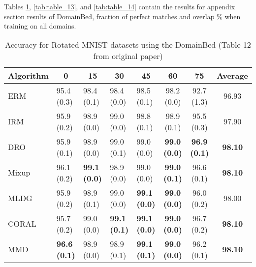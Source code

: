
Tables \ref{tab:table_12}, \ref{tab:table_13}, and \ref{tab:table_14} contain the results for appendix section results of DomainBed, fraction of perfect matches and overlap \% when training on all domains.

\begin{table}[h!]
\centering
\caption{\label{tab:table_12}Accuracy for Rotated MNIST datasets using the DomainBed (Table 12 from original paper)}
\begin{adjustbox}{width=\columnwidth,center}
\begin{tabular}{l|llllccc}
\hline
Algorithm & \multicolumn{1}{c}{0} & \multicolumn{1}{c}{15} & \multicolumn{1}{c}{30} & \multicolumn{1}{c}{45} & \multicolumn{1}{c}{60} & \multicolumn{1}{c}{75} & \multicolumn{1}{c}{Average}   \\ \hline
ERM       & 95.4 (0.3)            & 98.4 (0.1)             & 98.4 (0.0)             & 98.5 (0.1)             & 98.2 (0.0)             & 92.7 (1.3)             & 96.93 \\
IRM       & 95.9 (0.2)            & 98.9 (0.0)             & 99.0 (0.0)             & 98.8 (0.1)             & 98.9 (0.1)             & 95.5 (0.3)             & 97.90                         \\
DRO       & 95.9 (0.1)            & 98.9 (0.0)             & 99.0 (0.1)             & 99.0 (0.0)             & \textbf{99.0 (0.0)}    & \textbf{96.9 (0.1)}    & \textbf{98.10}                \\
Mixup     & 96.1 (0.2)            & \textbf{99.1 (0.0)}    & 98.9 (0.0)             & 99.0 (0.0)             & \textbf{99.0 (0.1)}    & 96.6 (0.1)             & \textbf{98.10}                \\
MLDG      & 95.9 (0.2)            & 98.9 (0.1)             & 99.0 (0.0)             & \textbf{99.1 (0.0)}    & \textbf{99.0 (0.0)}    & 96.0 (0.2)             & 98.00                         \\
CORAL     & 95.7 (0.2)            & 99.0 (0.0)             & \textbf{99.1 (0.1)}    & \textbf{99.1 (0.0)}    & \textbf{99.0 (0.0)}    & 96.7 (0.2)             & \textbf{98.10}                \\
MMD       & \textbf{96.6 (0.1)}   & 98.9 (0.0)             & 98.9 (0.1)             & \textbf{99.1 (0.1)}    & \textbf{99.0 (0.0)}    & 96.2 (0.1)             & \textbf{98.10}                \\

\end{tabular}
\end{adjustbox}
\end{table}
